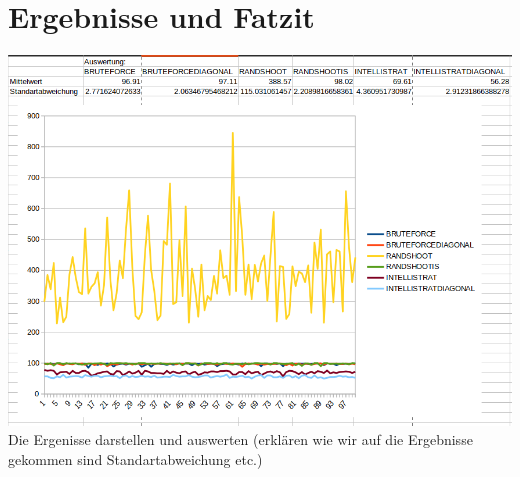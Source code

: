 \section*{Ergebnisse und Fatzit}


\includegraphics[scale=0.5]{Screenshot from 2022-02-08 08-28-03.png}
Die Ergenisse darstellen und auswerten (erklären wie wir auf die Ergebnisse gekommen sind Standartabweichung etc.)